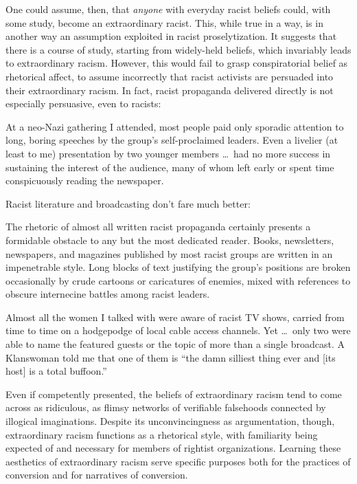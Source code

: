 \documentclass[11pt]{article}
\begin{document}
One could assume, then, that \textit{anyone} with everyday racist beliefs could, with some study, become an extraordinary racist. This, while true in a way, is in another way an assumption exploited in racist proselytization. It suggests that there is a course of study, starting from widely-held beliefs, which invariably leads to extraordinary racism. However, this would fail to grasp conspiratorial belief as rhetorical affect, to assume incorrectly that racist activists are persuaded into their extraordinary racism. In fact, racist propaganda delivered directly is not especially persuasive, even to racists:
\begin{displayquote}
    At a neo-Nazi gathering I attended, most people paid only sporadic attention to long, boring speeches by the group's self-proclaimed leaders. Even a livelier (at least to me) presentation by two younger members \dots\ had no more success in sustaining the interest of the audience, many of whom left early or spent time conspicuously reading the newspaper.\autocite[76]{Bl02}
\end{displayquote}
Racist literature and broadcasting don't fare much better:
\begin{displayquote}
    The rhetoric of almost all written racist propaganda certainly presents a formidable obstacle to any but the most dedicated reader. Books, newsletters, newspapers, and magazines published by most racist groups are written in an impenetrable style. Long blocks of text justifying the group's positions are broken occasionally by crude cartoons or caricatures of enemies, mixed with references to obscure internecine battles among racist leaders.

    Almost all the women I talked with were aware of racist TV shows, carried from time to time on a hodgepodge of local cable access channels. Yet \dots\ only two were able to name the featured guests or the topic of more than a single broadcast. A Klanswoman told me that one of them is ``the damn silliest thing ever and [its host] is a total buffoon.''\autocite[77]{Bl02}
\end{displayquote}

Even if competently presented, the beliefs of extraordinary racism tend to come across as ridiculous, as flimsy networks of verifiable falsehoods connected by illogical imaginations. Despite its unconvincingness as argumentation, though, extraordinary racism functions as a rhetorical style, with familiarity being expected of and necessary for members of rightist organizations. Learning these aesthetics of extraordinary racism serve specific purposes both for the practices of conversion and for narratives of conversion. 
\end{document}
